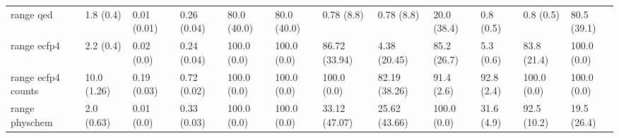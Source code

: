 \begin{tabular}{llllllllllll}
range qed & {\cellcolor[HTML]{E9F7FA}} \color[HTML]{000000} 1.8 (0.4) & {\cellcolor[HTML]{F7FCFD}} \color[HTML]{000000} 0.01 (0.01) & {\cellcolor[HTML]{C8EBE4}} \color[HTML]{000000} 0.26 (0.04) & {\cellcolor[HTML]{157F3B}} \color[HTML]{F1F1F1} 80.0 (40.0) & {\cellcolor[HTML]{157F3B}} \color[HTML]{F1F1F1} 80.0 (40.0) & {\cellcolor[HTML]{F6FCFD}} \color[HTML]{000000} 0.78 (8.8) & {\cellcolor[HTML]{F6FCFD}} \color[HTML]{000000} 0.78 (8.8) & {\cellcolor[HTML]{D6F0EE}} \color[HTML]{000000} 20.0 (38.4) & {\cellcolor[HTML]{F6FCFD}} \color[HTML]{000000} 0.8 (0.5) & {\cellcolor[HTML]{F6FCFD}} \color[HTML]{000000} 0.8 (0.5) & {\cellcolor[HTML]{137D39}} \color[HTML]{F1F1F1} 80.5 (39.1) \\
range ecfp4 & {\cellcolor[HTML]{E8F6FA}} \color[HTML]{000000} 2.2 (0.4) & {\cellcolor[HTML]{F7FCFD}} \color[HTML]{000000} 0.02 (0.0) & {\cellcolor[HTML]{CDECE7}} \color[HTML]{000000} 0.24 (0.04) & {\cellcolor[HTML]{00441B}} \color[HTML]{F1F1F1} 100.0 (0.0) & {\cellcolor[HTML]{00441B}} \color[HTML]{F1F1F1} 100.0 (0.0) & {\cellcolor[HTML]{016E2D}} \color[HTML]{F1F1F1} 86.72 (33.94) & {\cellcolor[HTML]{F1FAFC}} \color[HTML]{000000} 4.38 (20.45) & {\cellcolor[HTML]{067230}} \color[HTML]{F1F1F1} 85.2 (26.7) & {\cellcolor[HTML]{F0F9FB}} \color[HTML]{000000} 5.3 (0.6) & {\cellcolor[HTML]{0A7633}} \color[HTML]{F1F1F1} 83.8 (21.4) & {\cellcolor[HTML]{00441B}} \color[HTML]{F1F1F1} 100.0 (0.0) \\
range ecfp4 counts & {\cellcolor[HTML]{F4FBFC}} \color[HTML]{000000} 10.0 (1.26) & {\cellcolor[HTML]{F7FCFD}} \color[HTML]{000000} 0.19 (0.03) & {\cellcolor[HTML]{2B9452}} \color[HTML]{F1F1F1} 0.72 (0.02) & {\cellcolor[HTML]{00441B}} \color[HTML]{F1F1F1} 100.0 (0.0) & {\cellcolor[HTML]{00441B}} \color[HTML]{F1F1F1} 100.0 (0.0) & {\cellcolor[HTML]{00441B}} \color[HTML]{F1F1F1} 100.0 (0.0) & {\cellcolor[HTML]{0E7936}} \color[HTML]{F1F1F1} 82.19 (38.26) & {\cellcolor[HTML]{005F26}} \color[HTML]{F1F1F1} 91.4 (2.6) & {\cellcolor[HTML]{005B25}} \color[HTML]{F1F1F1} 92.8 (2.4) & {\cellcolor[HTML]{00441B}} \color[HTML]{F1F1F1} 100.0 (0.0) & {\cellcolor[HTML]{00441B}} \color[HTML]{F1F1F1} 100.0 (0.0) \\
range physchem & {\cellcolor[HTML]{F5FBFC}} \color[HTML]{000000} 2.0 (0.63) & {\cellcolor[HTML]{F6FCFD}} \color[HTML]{000000} 0.01 (0.0) & {\cellcolor[HTML]{AADFD3}} \color[HTML]{000000} 0.33 (0.03) & {\cellcolor[HTML]{00441B}} \color[HTML]{F1F1F1} 100.0 (0.0) & {\cellcolor[HTML]{00441B}} \color[HTML]{F1F1F1} 100.0 (0.0) & {\cellcolor[HTML]{ACDFD4}} \color[HTML]{000000} 33.12 (47.07) & {\cellcolor[HTML]{CAEBE5}} \color[HTML]{000000} 25.62 (43.66) & {\cellcolor[HTML]{00441B}} \color[HTML]{F1F1F1} 100.0 (0.0) & {\cellcolor[HTML]{B2E2D7}} \color[HTML]{000000} 31.6 (4.9) & {\cellcolor[HTML]{005C25}} \color[HTML]{F1F1F1} 92.5 (10.2) & {\cellcolor[HTML]{D7F0EE}} \color[HTML]{000000} 19.5 (26.4) \\

\end{tabular}
